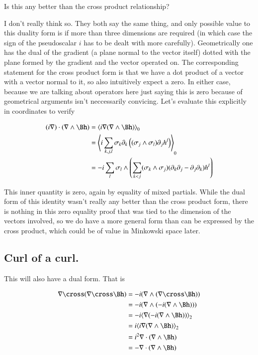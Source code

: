 \documentclass{article}
\begin{document}
Is this any better than the cross product relationship?

I don't really think so.  They both say the same thing, and only possible value to this duality form is if more than three dimensions are required (in which case the sign of the pseudoscalar $i$ has to be dealt with more carefully).  Geometrically one has the dual of the gradient (a plane normal to the vector itself) dotted with the plane formed by the gradient and the vector operated on.  The corresponding statement for the cross product form is that we have a dot product of a vector with a vector normal to it, so also intuitively expect a zero.  In either case, because we are talking about operators here
just saying this is zero because of geometrical arguments isn't neccessarily convicing.  Let's evaluate this explicitly in 
coordinates to verify

\begin{align*}
(i \grad) \cdot (\grad \wedge \Bh) 
&= \gpgradezero{i \grad (\grad \wedge \Bh) } \\
&= \gpgradezero{i \sum_{k,j,l} \sigma_k \partial_k \left((\sigma_j \wedge \sigma_l) \partial_j h^l\right) } \\
&= -i \sum_{l} \sigma_l \wedge \left( \sum_{k<j} (\sigma_k \wedge \sigma_j) (\partial_k \partial_j -\partial_j \partial_k) h^l \right) \\
\end{align*}

This inner quantity is zero, again by equality of mixed partials.  While the dual form of this identity wasn't really any better than the cross
product form, there is nothing in this zero equality proof that was tied to the dimension of the vectors involved, so we do have a more general form
than can be expressed by the cross product, which could be of value in Minkowski space later.

\subsection{ Curl of a curl. }

This will also have a dual form.  That is

\begin{align*}
\grad \cross (\grad \cross \Bh)
&= -i (\grad \wedge (\grad \cross \Bh)) \\
&= -i (\grad \wedge (-i (\grad \wedge \Bh))) \\
&= -i \gpgradetwo{\grad (-i (\grad \wedge \Bh))} \\
&= i \gpgradetwo{i \grad (\grad \wedge \Bh)} \\
&= i^2 \grad \cdot (\grad \wedge \Bh) \\
&= - \grad \cdot (\grad \wedge \Bh) \\
\end{align*}
\end{document}
